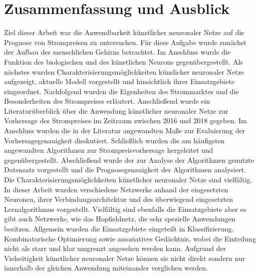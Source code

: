 

\section{Zusammenfassung und Ausblick} 

Ziel dieser Arbeit war die Anwendbarkeit künstlicher neuronaler Netze auf die Prognose von Strompreisen zu untersuchen. Für diese Aufgabe wurde zunächst der Aufbau des menschlichen Gehirns betrachtet. Im Anschluss wurde die Funktion des biologischen und des künstlichen Neurons gegenübergestellt. Als nächstes wurden Charakterisierungsmöglichkeiten künslicher neuronaler Netze aufgezeigt, aktuelle Modell vorgestellt und hinsichtlich ihrer Einsatzgebiete eingeordnet. Nachfolgend wurden die Eigenheiten des Strommarktes und die Besonderheiten des Strompreises erläutert. Anschließend wurde ein Literaturüberblick über die Anwendung künstlicher neuronaler Netze zur Vorhersage des Strompreises im Zeitraum zwischen 2016 und 2018 gegeben. Im Anschluss wurden die in der Literatur angewandten Maße zur Evaluierung der Vorhersagegenauigkeit disskutiert. Schließlich wurden die am häufigsten angewandten Algorithmen zur Strompreisvorhersage hergeleitet und gegenübergestellt. Abschließend wurde der zur Analyse der Algorithmen genutzte Datensatz vorgestellt und die Prognosegenauigkeit der Algorithmen analysiert.\\

Die Charakterisierungsmöglichkeiten künstlicher neuronaler Netze sind vielfältig. In dieser Arbeit wurden verschiedene Netzwerke anhand der eingesetzten Neuronen, ihrer Verbindungsarchitektur und des überwiegend eingesetzten Lernalgorithmus vorgestellt. Vielfältig sind ebenfalls die Einsatzgebiete aber es gibt auch Netzwerke, wie das Hopfieldnetz, die sehr spezielle Anwendungen besitzen. Allgemein wurden die Einsatzgebiete eingeteilt in Klassifizierung, Kombinatorische Optimierung sowie assoziatives Gedächtnis, wobei die Einteilung nicht als starr und klar umgrenzt angesehen werden kann. Aufgrund der Vielseitigkeit künstlicher neuronaler Netze können sie nicht direkt sondern nur innerhalb der gleichen Anwendung miteinander verglichen werden. \\

